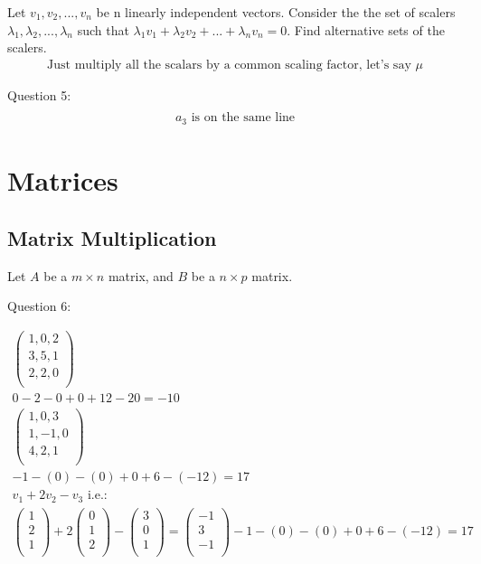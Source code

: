 \documentclass{article}
\begin{document}
Let $v_1, v_2, ..., v_n$ be n linearly independent vectors.
Consider the the set of scalers $\lambda_1, \lambda_2, ..., \lambda_n$ such that $\lambda_1 v_1 + \lambda_2 v_2 + ... + \lambda_n v_n = 0$.
Find alternative sets of the scalers.
\begin{align*}
    \textrm{Just multiply all the scalars by a common scaling factor, let's say } \mu
\end{align*}

Question 5:
\begin{align*}
    \textrm{} \\
    a_3 \textrm{ is on the same line}
\end{align*}

\section{Matrices}


\subsection{Matrix Multiplication}

Let $A$ be a $m \times n$ matrix, and $B$ be a $n \times p$ matrix.


Question 6:

\begin{align}
\begin{pmatrix}1, 0, 2 \\
3,5,1 \\
2,2,0 \\
\end{pmatrix} \\
0 - 2 - 0 + 0 + 12 - 20 = -10 \\
\begin{pmatrix}
1 , 0 , 3 \\
1, -1, 0 \\
4, 2, 1 \\
\end{pmatrix} \\
-1 -(0) -(0) + 0  + 6 -(-12) = 17 \\
v_1 + 2v_2 - v_3 \textrm{ i.e.:} \\
\begin{pmatrix} 1 \\ 2 \\ 1 \\ \end{pmatrix} + 2 \begin{pmatrix} 0 \\ 1 \\ 2 \\ \end{pmatrix} - \begin{pmatrix} 3 \\ 0 \\ 1 \\ \end{pmatrix} = \begin{pmatrix} -1 \\ 3 \\ -1 \\ \end{pmatrix}
-1 -(0) -(0) + 0 + 6 -(-12) = 17 \\
\end{align}
\end{document}
